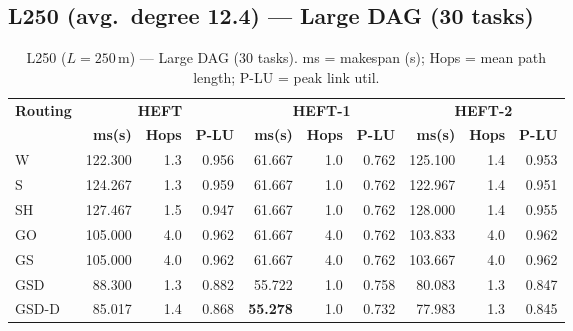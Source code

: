 \documentclass[11pt]{article}
\newcommand{\win}[1]{\textcolor{green!50!black}{\textbf{#1}}}
\newcommand{\bad}[1]{\textcolor{red!70!black}{#1}}
\begin{document}
\subsection{L250 (avg.\ degree 12.4) --- Large DAG (30 tasks)}
\begin{table}[H]
\centering\small
\begin{tabular}{l r r r r r r r r r}
\toprule
\textbf{Routing} & \multicolumn{3}{c}{\textbf{HEFT}} & \multicolumn{3}{c}{\textbf{HEFT-1}} & \multicolumn{3}{c}{\textbf{HEFT-2}} \\
\cmidrule(lr){2-4}\cmidrule(lr){5-7}\cmidrule(lr){8-10}
& \textbf{ms(s)} & \textbf{Hops} & \textbf{P-LU} & \textbf{ms(s)} & \textbf{Hops} & \textbf{P-LU} & \textbf{ms(s)} & \textbf{Hops} & \textbf{P-LU} \\
\midrule
  W & 122.300 & 1.3 & 0.956 & \bad{61.667} & 1.0 & 0.762 & 125.100 & 1.4 & 0.953 \\
  S & 124.267 & 1.3 & 0.959 & \bad{61.667} & 1.0 & 0.762 & 122.967 & 1.4 & 0.951 \\
  SH & \bad{127.467} & 1.5 & 0.947 & \bad{61.667} & 1.0 & 0.762 & \bad{128.000} & 1.4 & 0.955 \\
  GO & 105.000 & 4.0 & 0.962 & \bad{61.667} & 4.0 & 0.762 & 103.833 & 4.0 & 0.962 \\
  GS & 105.000 & 4.0 & 0.962 & \bad{61.667} & 4.0 & 0.762 & 103.667 & 4.0 & 0.962 \\
  GSD & 88.300 & 1.3 & 0.882 & 55.722 & 1.0 & 0.758 & 80.083 & 1.3 & 0.847 \\
  GSD-D & 85.017 & 1.4 & 0.868 & \win{55.278} & 1.0 & 0.732 & 77.983 & 1.3 & 0.845 \\
\bottomrule
\end{tabular}
\caption{L250 ($L=250$\,m) --- Large DAG (30 tasks). ms = makespan (s); Hops = mean path length; P-LU = peak link util.}
\end{table}
\end{document}
